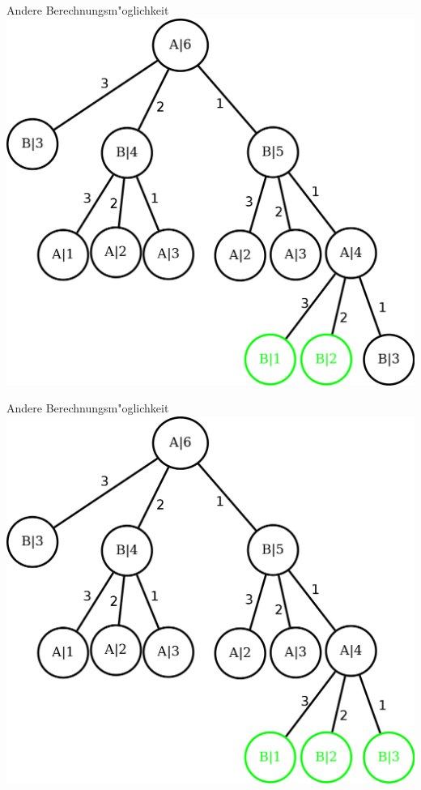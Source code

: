 \documentclass[18pt]{beamer}
\begin{document}
\begin{frame}{Andere Berechnungsm"oglichkeit}
\includegraphics[scale=0.4]{baum2.png}
\end{frame}

\begin{frame}{Andere Berechnungsm"oglichkeit}
\includegraphics[scale=0.4]{baum3.png}
\end{frame}
\end{document}
